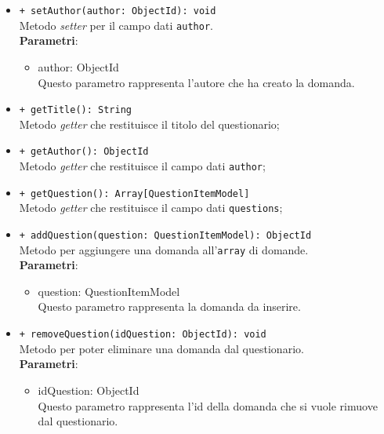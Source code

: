 \begin{itemize}
\begin{itemize}
				\item \texttt{+ setAuthor(author: ObjectId): void} \\
				Metodo \textit{setter} per il campo dati \texttt{author}.\\
				\textbf{Parametri}:
				\begin{itemize}
					\item {author: ObjectId}\\
					Questo parametro rappresenta l'autore che ha creato la domanda.
				\end{itemize}
				
				\item \texttt{+ getTitle(): String} \\
				Metodo \textit{getter} che restituisce il titolo del questionario;
				
				\item \texttt{+ getAuthor(): ObjectId} \\
				Metodo \textit{getter} che restituisce il campo dati \texttt{author};
				
				\item \texttt{+ getQuestion(): Array[QuestionItemModel]} \\
				Metodo \textit{getter} che restituisce il campo dati \texttt{questions};
				
				\item \texttt{+ addQuestion(question: QuestionItemModel): ObjectId} \\
				Metodo per aggiungere una domanda all'\texttt{array} di domande.\\
				\textbf{Parametri}:
				\begin{itemize}
					\item {question: QuestionItemModel}\\
					Questo parametro rappresenta la domanda da inserire.
				\end{itemize}
				
				\item \texttt{+ removeQuestion(idQuestion: ObjectId): void} \\
				Metodo per poter eliminare una domanda dal questionario.\\
				\textbf{Parametri}:
				\begin{itemize}
					\item {idQuestion: ObjectId}\\
					Questo parametro rappresenta l'id della domanda che si vuole rimuove dal questionario.
				\end{itemize}
				
				
			\end{itemize}
		\end{itemize}	
		
		